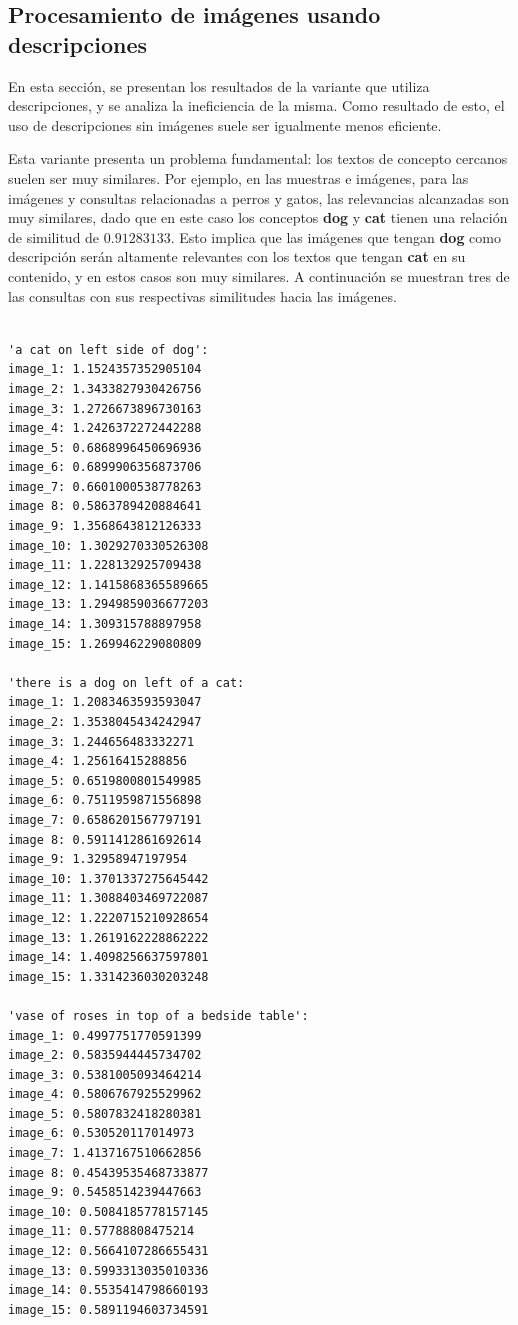 \subsection{Procesamiento de im\'agenes usando descripciones}
En esta sección, se presentan los resultados de la variante que utiliza descripciones, y se analiza la ineficiencia de la misma. Como resultado de esto, el uso de descripciones sin im\'agenes suele ser igualmente menos eficiente.

Esta variante presenta un problema fundamental: los textos de concepto cercanos suelen ser muy similares. Por ejemplo, en las muestras e im\'agenes, para las im\'agenes y consultas relacionadas a perros y gatos, las relevancias alcanzadas son muy similares, dado que en este caso los conceptos \textbf{dog} y \textbf{cat} tienen una relación de similitud de $0.91283133$. Esto implica que las im\'agenes que tengan \textbf{dog} como descripción ser\'an altamente relevantes con los textos que tengan \textbf{cat} en su contenido, y en estos casos son muy similares. A continuaci\'on se muestran tres de las consultas con sus respectivas similitudes hacia las im\'agenes.

\begin{verbatim}

'a cat on left side of dog':
image_1: 1.1524357352905104
image_2: 1.3433827930426756
image_3: 1.2726673896730163
image_4: 1.2426372272442288
image_5: 0.6868996450696936
image_6: 0.6899906356873706
image_7: 0.6601000538778263
image 8: 0.5863789420884641
image_9: 1.3568643812126333
image_10: 1.3029270330526308
image_11: 1.228132925709438
image_12: 1.1415868365589665
image_13: 1.2949859036677203
image_14: 1.309315788897958
image_15: 1.269946229080809

'there is a dog on left of a cat:
image_1: 1.2083463593593047
image_2: 1.3538045434242947
image_3: 1.244656483332271
image_4: 1.25616415288856
image_5: 0.6519800801549985
image_6: 0.7511959871556898
image_7: 0.6586201567797191
image 8: 0.5911412861692614
image_9: 1.32958947197954
image_10: 1.3701337275645442
image_11: 1.3088403469722087
image_12: 1.2220715210928654
image_13: 1.2619162228862222
image_14: 1.4098256637597801
image_15: 1.3314236030203248

'vase of roses in top of a bedside table':
image_1: 0.4997751770591399
image_2: 0.5835944445734702
image_3: 0.5381005093464214
image_4: 0.5806767925529962
image_5: 0.5807832418280381
image_6: 0.530520117014973
image_7: 1.4137167510662856
image 8: 0.45439535468733877
image_9: 0.5458514239447663
image_10: 0.5084185778157145
image_11: 0.57788808475214
image_12: 0.5664107286655431
image_13: 0.5993313035010336
image_14: 0.5535414798660193
image_15: 0.5891194603734591

\end{verbatim}


